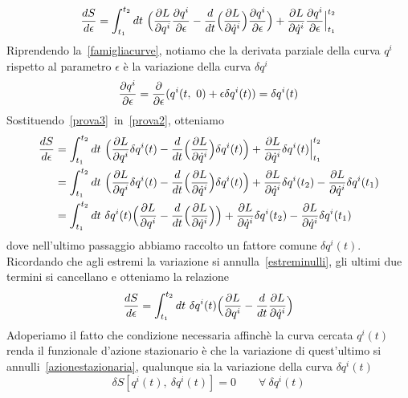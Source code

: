     \begin{equation}\label{prova2}
        \frac{dS}{d\epsilon} = \int_{t_1}^{t_2}dt~ \Big (\frac{\partial L}{\partial q^i} \frac{\partial q^i}{\partial\epsilon} - \frac{d}{dt} \Big (\frac{\partial L}{\partial\dot q^i} \Big) \frac{\partial q^i}{\partial\epsilon} \Big) + \frac{\partial L}{\partial\dot q^i} \frac{\partial q^i}{\partial\epsilon} \Big \vert_{t_1}^{t_2}
    \end{equation}
    Riprendendo la~\eqref{famigliacurve}, notiamo che la derivata parziale della curva $q^i$ rispetto al parametro $\epsilon$ è la variazione della curva $\delta q^i$
    \begin{equation}\label{prova3}
        \frac{\partial q^i}{\partial\epsilon} = \frac{\partial}{\partial\epsilon} (q^i(t, ~ 0) + \epsilon \delta q^i(t)) = \delta q^i(t)
    \end{equation}
    Sostituendo~\eqref{prova3}~in~\eqref{prova2}, otteniamo 
    \begin{equation*}
    \begin{aligned}
        \frac{dS}{d\epsilon} & = \int_{t_1}^{t_2}dt~ \Big (\frac{\partial L}{\partial q^i} \delta q^i(t) - \frac{d}{dt} \Big (\frac{\partial L}{\partial\dot q^i} \Big) \delta q^i(t) \Big) + \frac{\partial L}{\partial\dot q^i} \delta q^i(t) \Big \vert_{t_1}^{t_2} \\  & = \int_{t_1}^{t_2}dt~ \Big (\frac{\partial L}{\partial q^i} \delta q^i(t) - \frac{d}{dt} \Big (\frac{\partial L}{\partial\dot q^i} \Big) \delta q^i(t) \Big) + \frac{\partial L}{\partial\dot q^i} \delta q^i(t_2) - \frac{\partial L}{\partial\dot q^i} \delta q^i(t_1) \\ & = \int_{t_1}^{t_2}dt~ \delta q^i(t) \Big (\frac{\partial L}{\partial q^i}  - \frac{d}{dt} \Big (\frac{\partial L}{\partial\dot q^i} \Big) \Big) + \frac{\partial L}{\partial\dot q^i} \delta q^i(t_2) - \frac{\partial L}{\partial\dot q^i} \delta q^i(t_1)
    \end{aligned}
    \end{equation*}
    dove nell'ultimo passaggio abbiamo raccolto un fattore comune $\delta q^i(t)$. Ricordando che agli estremi la variazione si annulla~\eqref{estreminulli}, gli ultimi due termini si cancellano e otteniamo la relazione
    \begin{equation} \label{prova4}
        \frac{dS}{d\epsilon} = \int_{t_1}^{t_2}dt~ \delta q^i(t) \Big (\frac{\partial L}{\partial q^i}  - \frac{d}{dt} \frac{\partial L}{\partial\dot q^i} \Big)
    \end{equation}
    Adoperiamo il fatto che condizione necessaria affinchè la curva cercata $q^i(t)$ renda il funzionale d'azione stazionario è che la variazione di quest'ultimo si annulli~\eqref{azionestazionaria}, qualunque sia la variazione della curva $\delta q^i(t)$
    \begin{equation} \label{prova5}
        \delta S[q^i(t), ~ \delta q^i(t)] = 0 \qquad \forall ~ \delta q^i(t)
    \end{equation}
